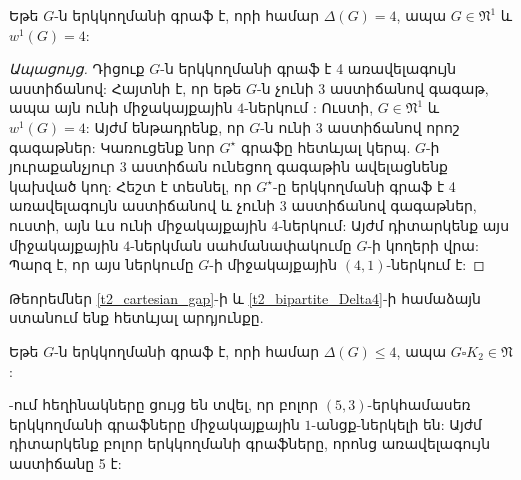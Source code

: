 \begin{theorem}
\label{t2_bipartite_Delta4} Եթե $G$-ն երկկողմանի գրաֆ է, որի համար $\Delta(G)=4$,
ապա $G\in \mathfrak{N}^{1}$ և $w^{1}(G)=4$:
\end{theorem}
\begin{proof}[Ապացույց] Դիցուք $G$-ն երկկողմանի գրաֆ է 4 առավելագույն աստիճանով:
Հայտնի է, որ եթե $G$-ն չունի 3 աստիճանով գագաթ, ապա այն ունի միջակայքային $4$-ներկում \cite{Giaro1997}: Ուստի, $G\in
\mathfrak{N}^{1}$ և $w^{1}(G)=4$: Այժմ ենթադրենք, որ $G$-ն ունի 3 աստիճանով որոշ գագաթներ: Կառուցենք նոր $G^{\star}$ գրաֆը հետևյալ կերպ. $G$-ի յուրաքանչյուր $3$ աստիճան ունեցող գագաթին ավելացնենք կախված կող: Հեշտ է տեսնել, որ $G^{\star}$-ը երկկողմանի գրաֆ է 4 առավելագույն աստիճանով և չունի 3 աստիճանով գագաթներ, ուստի, այն ևս ունի միջակայքային $4$-ներկում: Այժմ դիտարկենք այս միջակայքային $4$-ներկման սահմանափակումը $G$-ի կողերի վրա: Պարզ է, որ այս ներկումը $G$-ի միջակայքային $(4,1)$-ներկում է:
\end{proof}

Թեորեմներ \ref{t2_cartesian_gap}-ի և \ref{t2_bipartite_Delta4}-ի համաձայն ստանում ենք հետևյալ արդյունքը.

\begin{corollary}
\label{c2_bipartite_Delta4} Եթե $G$-ն երկկողմանի գրաֆ է, որի համար $\Delta(G)\leq
4$, ապա $G\square K_{2}\in \mathfrak{N}$:
\end{corollary}

\cite{CarlJToft}-ում հեղինակները ցույց են տվել, որ բոլոր $(5,3)$-երկհամասեռ երկկողմանի գրաֆները միջակայքային $1$-անցք-ներկելի են: Այժմ դիտարկենք բոլոր երկկողմանի գրաֆները, որոնց առավելագույն աստիճանը 5 է:

